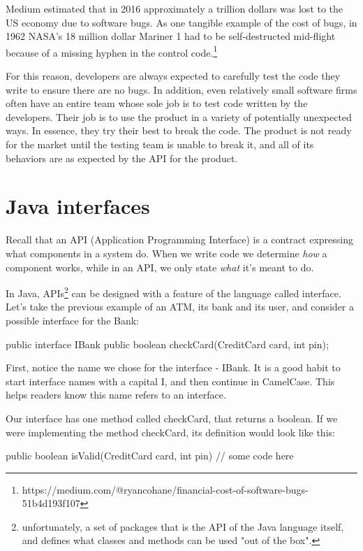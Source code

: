 Medium estimated that in 2016 approximately a trillion dollars was lost to the US economy due to software bugs. As one tangible example of the cost of bugs, in 1962 NASA's 18 million dollar Mariner 1 had to be self-destructed mid-flight because of a missing hyphen in the control code.\footnote{https://medium.com/@ryancohane/financial-cost-of-software-bugs-51b4d193f107}

For this reason, developers are always expected to carefully test the code they write to ensure there are no bugs. In addition, even relatively small software firms often have an entire team whose sole job is to test code written by the developers. Their job is to use the product in a variety of potentially unexpected ways. In essence, they try their best to break the code. The product is not ready for the market until the testing team is unable to break it, and all of its behaviors are as expected by the API for the product. 


\section{Java interfaces}
Recall that an API (Application Programming Interface) is a contract expressing what components in a system do. When we write code we determine \emph{how} a component works, while in an API, we only state \emph{what} it's meant to do.

In Java, APIs\footnote{unfortunately, a set of packages that is the API of the Java language itself, and defines what classes and methods can be used "out of the box".} can be designed with a feature of the language called interface. Let's take the previous example of an ATM, its bank and its user, and consider a possible interface for the Bank:

\begin{code}
public interface IBank {
    public boolean checkCard(CreditCard card, int pin);
}
\end{code}

First, notice the name we chose for the interface - IBank. It is a good habit to start interface names with a capital I, and then continue in CamelCase. This helps readers know this name refers to an interface.

Our interface has one method called checkCard, that returns a boolean. If we were implementing the method checkCard, its definition would look like this:

\begin{code}
public boolean isValid(CreditCard card, int pin) {
    // some code here
}
\end{code}

